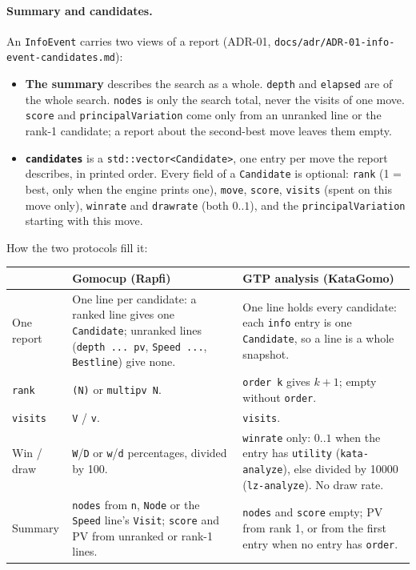 \documentclass[11pt,a4paper]{article}
\newcommand{\code}[1]{\texttt{#1}}
\newcommand{\file}[1]{\texttt{#1}}
\begin{document}
\paragraph{Summary and candidates.}\label{sec:candidates} An \code{InfoEvent} carries two views
of a report (ADR-01, \file{docs/adr/ADR-01-info-event-candidates.md}):

\begin{itemize}
  \item \textbf{The summary} describes the search as a whole. \code{depth} and \code{elapsed} are
        of the whole search. \code{nodes} is only the search total, never the visits of one move.
        \code{score} and \code{principalVariation} come only from an unranked line or the
        rank-1 candidate; a report about the second-best move leaves them empty.
  \item \textbf{\code{candidates}} is a \code{std::vector<Candidate>}, one entry per move the
        report describes, in printed order. Every field of a \code{Candidate} is optional:
        \code{rank} (1 = best, only when the engine prints one), \code{move}, \code{score},
        \code{visits} (spent on this move only), \code{winrate} and \code{drawrate} (both
        $0..1$), and the \code{principalVariation} starting with this move.
\end{itemize}

\noindent How the two protocols fill it:

\begin{center}
\small
\begin{tabularx}{\textwidth}{@{}l X X@{}}
\toprule
 & \textbf{Gomocup (Rapfi)} & \textbf{GTP analysis (KataGomo)} \\
\midrule
One report    & One line per candidate: a ranked line gives one \code{Candidate}; unranked
                lines (\code{depth ... pv}, \code{Speed ...}, \code{Bestline}) give none.
              & One line holds every candidate: each \code{info} entry is one
                \code{Candidate}, so a line is a whole snapshot. \\
\code{rank}   & \code{(N)} or \code{multipv N}. & \code{order k} gives $k+1$; empty without
                \code{order}. \\
\code{visits} & \code{V} / \code{v}. & \code{visits}. \\
Win / draw    & \code{W}/\code{D} or \code{w}/\code{d} percentages, divided by 100.
              & \code{winrate} only: $0..1$ when the entry has \code{utility}
                (\code{kata-analyze}), else divided by 10000 (\code{lz-analyze}). No draw rate. \\
Summary       & \code{nodes} from \code{n}, \code{Node} or the \code{Speed} line's
                \code{Visit}; \code{score} and PV from unranked or rank-1 lines.
              & \code{nodes} and \code{score} empty; PV from rank 1, or from the first entry
                when no entry has \code{order}. \\
\bottomrule
\end{tabularx}
\end{center}
\end{document}
